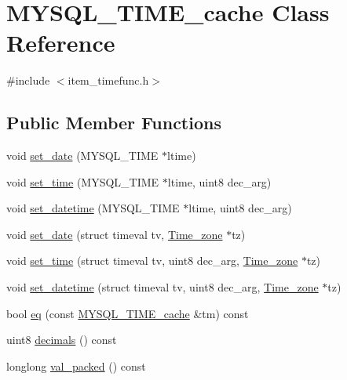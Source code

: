 \hypertarget{classMYSQL__TIME__cache}{}\section{M\+Y\+S\+Q\+L\+\_\+\+T\+I\+M\+E\+\_\+cache Class Reference}
\label{classMYSQL__TIME__cache}


{\ttfamily \#include $<$item\+\_\+timefunc.\+h$>$}

\subsection*{Public Member Functions}
\begin{DoxyCompactItemize}
\item 
void \mbox{\hyperlink{classMYSQL__TIME__cache_ab2263e69ce25616c73780c246d86f715}{set\+\_\+date}} (M\+Y\+S\+Q\+L\+\_\+\+T\+I\+ME $\ast$ltime)
\item 
void \mbox{\hyperlink{classMYSQL__TIME__cache_a075e291a39c3869e990f69c88e333e1e}{set\+\_\+time}} (M\+Y\+S\+Q\+L\+\_\+\+T\+I\+ME $\ast$ltime, uint8 dec\+\_\+arg)
\item 
void \mbox{\hyperlink{classMYSQL__TIME__cache_a8f17be69e8e2468d4ca7d56eff147ed6}{set\+\_\+datetime}} (M\+Y\+S\+Q\+L\+\_\+\+T\+I\+ME $\ast$ltime, uint8 dec\+\_\+arg)
\item 
void \mbox{\hyperlink{classMYSQL__TIME__cache_a928c9ffaf96b33d42e908522cddcf101}{set\+\_\+date}} (struct timeval tv, \mbox{\hyperlink{classTime__zone}{Time\+\_\+zone}} $\ast$tz)
\item 
void \mbox{\hyperlink{classMYSQL__TIME__cache_a2267c5fc6ba0a7874eb15e9cee8519e2}{set\+\_\+time}} (struct timeval tv, uint8 dec\+\_\+arg, \mbox{\hyperlink{classTime__zone}{Time\+\_\+zone}} $\ast$tz)
\item 
void \mbox{\hyperlink{classMYSQL__TIME__cache_a3121a1ec215a490a07f49f9adae7dc3b}{set\+\_\+datetime}} (struct timeval tv, uint8 dec\+\_\+arg, \mbox{\hyperlink{classTime__zone}{Time\+\_\+zone}} $\ast$tz)
\item 
bool \mbox{\hyperlink{classMYSQL__TIME__cache_ad093ed979c6d1b26e1252c660488296d}{eq}} (const \mbox{\hyperlink{classMYSQL__TIME__cache}{M\+Y\+S\+Q\+L\+\_\+\+T\+I\+M\+E\+\_\+cache}} \&tm) const
\item 
uint8 \mbox{\hyperlink{classMYSQL__TIME__cache_a4487d3497d3f7179868f8faffcc12dae}{decimals}} () const
\item 
longlong \mbox{\hyperlink{classMYSQL__TIME__cache_a21c1acacd08eb405ffd062d22798e739}{val\+\_\+packed}} () const

\end{DoxyCompactItemize}
